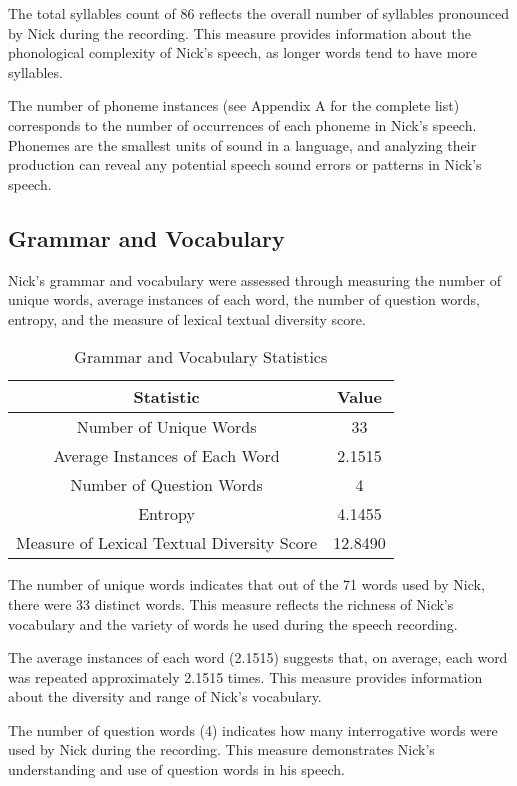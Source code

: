 \documentclass{article}
\begin{document}
The total syllables count of 86 reflects the overall number of syllables pronounced by Nick during the recording. This measure provides information about the phonological complexity of Nick's speech, as longer words tend to have more syllables.

The number of phoneme instances (see Appendix A for the complete list) corresponds to the number of occurrences of each phoneme in Nick's speech. Phonemes are the smallest units of sound in a language, and analyzing their production can reveal any potential speech sound errors or patterns in Nick's speech.

\subsection{Grammar and Vocabulary}

Nick's grammar and vocabulary were assessed through measuring the number of unique words, average instances of each word, the number of question words, entropy, and the measure of lexical textual diversity score.

\begin{table}[H]
\centering
\caption{Grammar and Vocabulary Statistics}
\begin{tabular}{|c|c|}
\hline
\textbf{Statistic} & \textbf{Value} \\ \hline
Number of Unique Words & 33 \\ \hline
Average Instances of Each Word & 2.1515 \\ \hline
Number of Question Words & 4 \\ \hline
Entropy & 4.1455 \\ \hline
Measure of Lexical Textual Diversity Score & 12.8490 \\ \hline
\end{tabular}
\end{table}

The number of unique words indicates that out of the 71 words used by Nick, there were 33 distinct words. This measure reflects the richness of Nick's vocabulary and the variety of words he used during the speech recording.

The average instances of each word (2.1515) suggests that, on average, each word was repeated approximately 2.1515 times. This measure provides information about the diversity and range of Nick's vocabulary. 

The number of question words (4) indicates how many interrogative words were used by Nick during the recording. This measure demonstrates Nick's understanding and use of question words in his speech.
\end{document}
